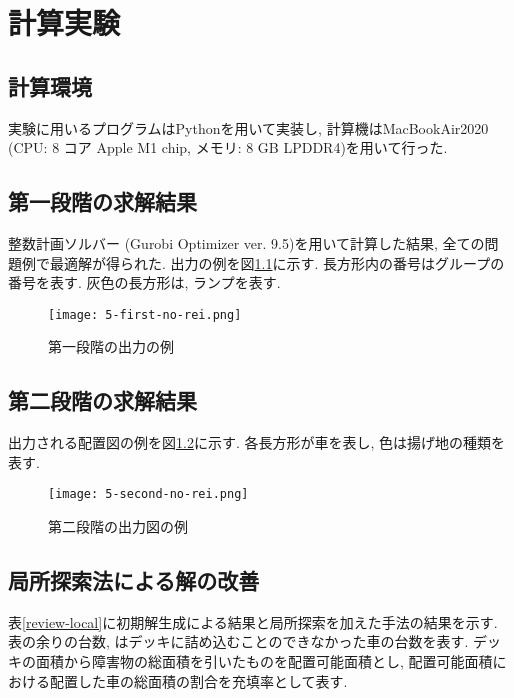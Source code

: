 \chapter{計算実験}\label{computational_result}
\section{計算環境}
実験に用いるプログラムはPythonを用いて実装し, 計算機はMacBookAir2020 (CPU: 8 コア Apple M1 chip, メモリ: 8 GB LPDDR4)を用いて行った. 

\section{第一段階の求解結果}
整数計画ソルバー (Gurobi Optimizer ver. 9.5)を用いて計算した結果, 全ての問題例で最適解が得られた. 
出力の例を図\ref{first-no-rei}に示す. 
長方形内の番号はグループの番号を表す. 
灰色の長方形は, ランプを表す. \\

\begin{figure}[b]
    \texttt{[image: 5-first-no-rei.png]}
    \caption{第一段階の出力の例}
    \label{first-no-rei}
\end{figure}
\clearpage

\section{第二段階の求解結果}
出力される配置図の例を図\ref{second-no-rei}に示す. 
各長方形が車を表し, 色は揚げ地の種類を表す. \\

\begin{figure}[b]
    \texttt{[image: 5-second-no-rei.png]}
    \caption{第二段階の出力図の例}
    \label{second-no-rei}
\end{figure}

\section{局所探索法による解の改善}
表\ref{review-local}に初期解生成による結果と局所探索を加えた手法の結果を示す. 
表の余りの台数, はデッキに詰め込むことのできなかった車の台数を表す. 
デッキの面積から障害物の総面積を引いたものを配置可能面積とし, 配置可能面積における配置した車の総面積の割合を充填率として表す. 


